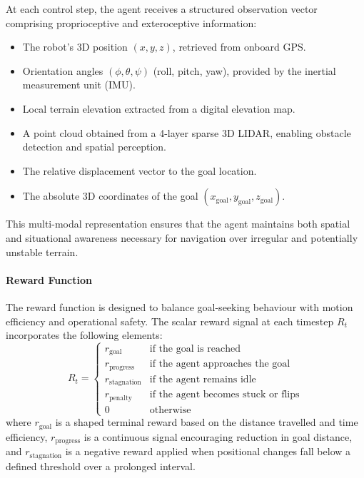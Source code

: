 \documentclass[conference]{IEEEtran}
\begin{document}
At each control step, the agent receives a structured observation vector comprising proprioceptive and exteroceptive information:
\begin{itemize}
    \item The robot's 3D position $(x, y, z)$, retrieved from onboard GPS.
    \item Orientation angles $(\phi, \theta, \psi)$ (roll, pitch, yaw), provided by the inertial measurement unit (IMU).
    \item Local terrain elevation extracted from a digital elevation map.
    \item A point cloud obtained from a 4-layer sparse 3D LIDAR, enabling obstacle detection and spatial perception.
    \item The relative displacement vector to the goal location.
    \item The absolute 3D coordinates of the goal $(x_{\text{goal}}, y_{\text{goal}}, z_{\text{goal}})$.
\end{itemize}

This multi-modal representation ensures that the agent maintains both spatial and situational awareness necessary for navigation over irregular and potentially unstable terrain.

\paragraph{Reward Function}

The reward function is designed to balance goal-seeking behaviour with motion efficiency and operational safety. The scalar reward signal at each timestep \( R_t \) incorporates the following elements:
\[
R_t =
\begin{cases}
r_{\text{goal}} & \text{if the goal is reached} \\
r_{\text{progress}} & \text{if the agent approaches the goal} \\
r_{\text{stagnation}} & \text{if the agent remains idle} \\
r_{\text{penalty}} & \text{if the agent becomes stuck or flips} \\
0 & \text{otherwise}
\end{cases}
\]
where \( r_{\text{goal}} \) is a shaped terminal reward based on the distance travelled and time efficiency, \( r_{\text{progress}} \) is a continuous signal encouraging reduction in goal distance, and \( r_{\text{stagnation}} \) is a negative reward applied when positional changes fall below a defined threshold over a prolonged interval.
\end{document}
